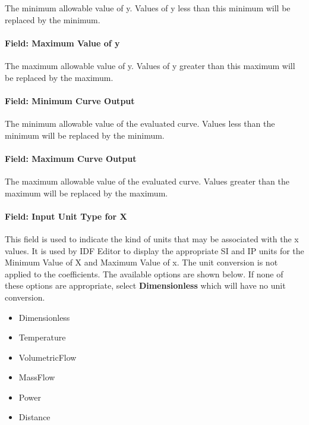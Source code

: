 The minimum allowable value of y. Values of y less than this minimum will be replaced by the minimum.

\paragraph{Field: Maximum Value of y}\label{field-maximum-value-of-y-1}

The maximum allowable value of y. Values of y greater than this maximum will be replaced by the maximum.

\paragraph{Field: Minimum Curve Output}\label{field-minimum-curve-output-5}

The minimum allowable value of the evaluated curve. Values less than the minimum will be replaced by the minimum.

\paragraph{Field: Maximum Curve Output}\label{field-maximum-curve-output-4}

The maximum allowable value of the evaluated curve. Values greater than the maximum will be replaced by the maximum.

\paragraph{Field: Input Unit Type for X}\label{field-input-unit-type-for-x-6}

This field is used to indicate the kind of units that may be associated with the x values. It is used by IDF Editor to display the appropriate SI and IP units for the Minimum Value of X and Maximum Value of x. The unit conversion is not applied to the coefficients. The available options are shown below. If none of these options are appropriate, select \textbf{Dimensionless} which will have no unit conversion.

\begin{itemize}
\item
  Dimensionless
\item
  Temperature
\item
  VolumetricFlow
\item
  MassFlow
\item
  Power
\item
  Distance
\end{itemize}


